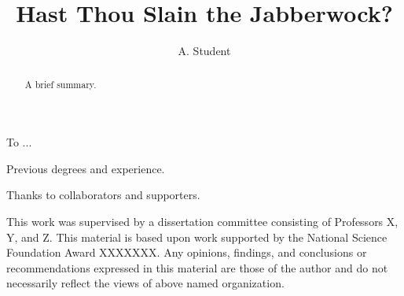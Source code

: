 \documentclass[12pt,leqno]{report}
\begin{document}
\sloppy
\title{Hast Thou Slain the Jabberwock?}
\author{A. Student}
\maketitle


\thispagestyle{plain}
\newenvironment{dedication}
{\cleardoublepage {}
  \begin{center} \em}
  {\end{center}  }
\begin{dedication}

   To ... 

\end{dedication}

\tableofcontents
\listoftables
\listoffigures

\begin{curriculumvitae}

  Previous degrees and experience.

\end{curriculumvitae}

\begin{acknowledgments}

  Thanks to collaborators and supporters.


 
\end{acknowledgments}

\begin{abstract}

  A brief summary.
  
\end{abstract}



\begin{contributors}

This work was supervised by a dissertation committee consisting of Professors
X, Y, and Z. 
This material is based upon work supported by the National Science Foundation Award
XXXXXXX.  Any opinions, findings, and conclusions or recommendations
expressed in this material are those of the author and do not necessarily
reflect the views of above named organization.

\end{contributors}
\end{document}
